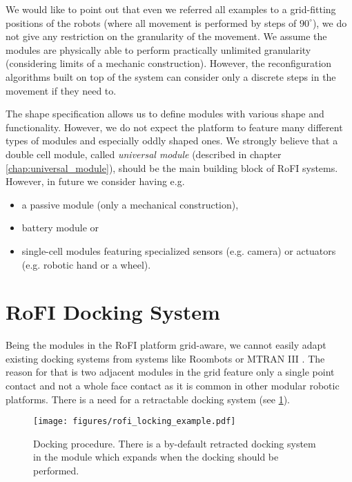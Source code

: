 We would like to point out that even we referred all examples to a grid-fitting
positions of the robots (where all movement is performed by steps of
$90^\circ$), we do not give any restriction on the granularity of the movement.
We assume the modules are physically able to perform practically unlimited
granularity (considering limits of a mechanic construction). However, the
reconfiguration algorithms built on top of the system can consider only a
discrete steps in the movement if they need to.

The shape specification allows us to define modules with various shape and
functionality. However, we do not expect the platform to feature many different
types of modules and especially oddly shaped ones. We strongly believe that a
double cell module, called \emph{universal module} (described in chapter
\ref{chap:universal_module}), should be the main building block of RoFI systems.
However, in future we consider having e.g.
\begin{itemize}
    \item a passive module (only a mechanical construction),
    \item battery module or
    \item single-cell modules featuring specialized sensors (e.g. camera) or
    actuators (e.g. robotic hand or a wheel).
\end{itemize}


\section{RoFI Docking System}\label{sec:dock}

Being the modules in the RoFI platform grid-aware, we cannot easily adapt
existing docking systems from systems like
Roombots\cite{bonardi_locomotion_2012} or MTRAN III
\cite{kurokawa_distributed_2008}. The reason for that is two adjacent modules in
the grid feature only a single point contact and not a whole face contact as it
is common in other modular robotic platforms. There is a need for a retractable
docking system (see \ref{fig:rofi_locking_example}).

\begin{figure}[h!]
    \centering
    \texttt{[image: figures/rofi\_locking\_example.pdf]}
    \caption{Docking procedure. There is a by-default retracted docking system
    in the module which expands when the docking should be performed.}
    \label{fig:rofi_locking_example}
\end{figure}


